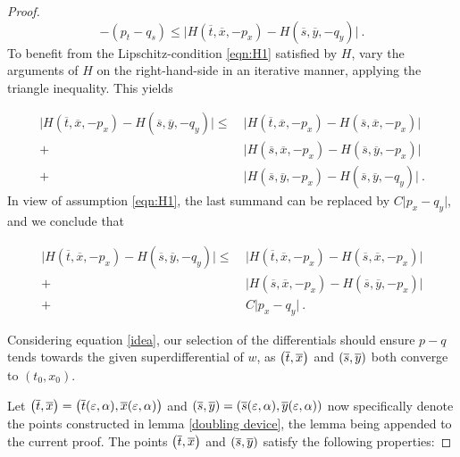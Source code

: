 \begin{theorem}
\begin{proof}
		  		\begin{equation*}
		  		-(p_t - q_s) \leq \lvert H(\overline{t}, \overline{x}, -p_x) - H(\overline{s}, \overline{y}, -q_y) \rvert \ .
		  		\end{equation*}
		  		To benefit from the Lipschitz-condition \eqref{eqn:H1} satisfied by $ H $, vary the arguments of $ H $ on the right-hand-side in an iterative manner, applying the triangle inequality. This yields
		  		
		  		\begin{equation*}
		  		\begin{split}
		  		\lvert H(\overline{t}, \overline{x}, -p_x) - H(\overline{s}, \overline{y}, -q_y) \rvert \leq \
		  		&\lvert H(\overline{t}, \overline{x}, -p_x) - H(\overline{s}, \overline{x}, -p_x) \rvert \\
		  		+&\lvert H(\overline{s}, \overline{x}, -p_x) - H(\overline{s}, \overline{y}, -p_x) \rvert \\
		  		+&\lvert H(\overline{s}, \overline{y}, -p_x) - H(\overline{s}, \overline{y}, -q_y) \rvert \ .
		  		\end{split} 
		  		\end{equation*}
		  		In view of assumption \eqref{eqn:H1}, the last summand can be replaced by $ C \lvert p_x - q_y \rvert $, and we conclude that
		  		
		  		\begin{equation}
		  		\label{idea}
		  		\begin{split}
		  		\lvert H(\overline{t}, \overline{x}, -p_x) - H(\overline{s}, \overline{y}, -q_y) \rvert \leq \
		  		&\lvert H(\overline{t}, \overline{x}, -p_x) - H(\overline{s}, \overline{x}, -p_x) \rvert \\
		  		+&\lvert H(\overline{s}, \overline{x}, -p_x) - H(\overline{s}, \overline{y}, -p_x) \rvert \\
		  		+& C \lvert p_x - q_y \rvert \ .
		  		\end{split}
		  		\end{equation}
		  		
		  		Considering equation \eqref{idea}, our selection of the differentials should ensure $ p - q $ tends towards the given superdifferential of $ w $, as $ \left(\overline{t}, \overline{x}\right) $ and $ \left(\overline{s}, \overline{y}\right) $ both converge to $ (t_0, x_0) $.
		  		
		  		Let $ \left(\overline{t}, \overline{x}\right) = \left( \overline{t}(\varepsilon, \alpha), \overline{x}(\varepsilon, \alpha) \right) $ and $ \left(\overline{s}, \overline{y}\right) = \left(\overline{s}(\varepsilon, \alpha), \overline{y}(\varepsilon, \alpha) \right) $ now specifically denote the points constructed in lemma \ref{doubling device}, the lemma being appended to the current proof. The points $ \left(\overline{t}, \overline{x}\right) $ and $ \left(\overline{s}, \overline{y}\right) $ satisfy the following properties:
		  		

\end{proof}
\end{theorem}
